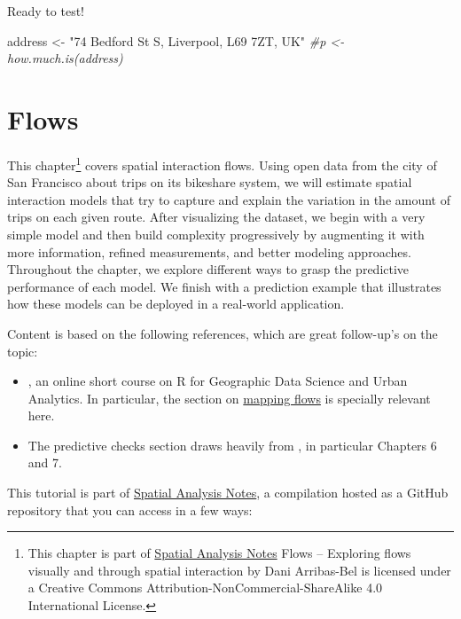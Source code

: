 \documentclass[]{book}
\newenvironment{Shaded}{\begin{snugshade}}{\end{snugshade}}
\newcommand{\StringTok}[1]{\textcolor[rgb]{0.31,0.60,0.02}{#1}}
\newcommand{\CommentTok}[1]{\textcolor[rgb]{0.56,0.35,0.01}{\textit{#1}}}
\newcommand{\NormalTok}[1]{#1}
\providecommand{\tightlist}{%
  \setlength{\itemsep}{0pt}\setlength{\parskip}{0pt}}
\begin{document}
Ready to test!

\begin{Shaded}
\begin{Highlighting}[]
\NormalTok{address <-}\StringTok{ "74 Bedford St S, Liverpool, L69 7ZT, UK"}
\CommentTok{#p <- how.much.is(address)}
\end{Highlighting}
\end{Shaded}

\chapter{Flows}\label{flows}

This chapter\footnote{This chapter is part of \href{index.html}{Spatial
  Analysis Notes} {Flows -- Exploring flows visually and through spatial
  interaction} by Dani Arribas-Bel is licensed under a Creative Commons
  Attribution-NonCommercial-ShareAlike 4.0 International License.}
covers spatial interaction flows. Using open data from the city of San
Francisco about trips on its bikeshare system, we will estimate spatial
interaction models that try to capture and explain the variation in the
amount of trips on each given route. After visualizing the dataset, we
begin with a very simple model and then build complexity progressively
by augmenting it with more information, refined measurements, and better
modeling approaches. Throughout the chapter, we explore different ways
to grasp the predictive performance of each model. We finish with a
prediction example that illustrates how these models can be deployed in
a real-world application.

Content is based on the following references, which are great
follow-up's on the topic:

\begin{itemize}
\tightlist
\item
  \citet{gds_ua17}, an online short course on R for Geographic Data
  Science and Urban Analytics. In particular, the section on
  \href{https://github.com/alexsingleton/GDS_UA_2017/tree/master/Mapping_Flows}{mapping
  flows} is specially relevant here.
\item
  The predictive checks section draws heavily from
  \citet{gelman2006data}, in particular Chapters 6 and 7.
\end{itemize}

This tutorial is part of \href{index.html}{Spatial Analysis Notes}, a
compilation hosted as a GitHub repository that you can access in a few
ways:
\end{document}
